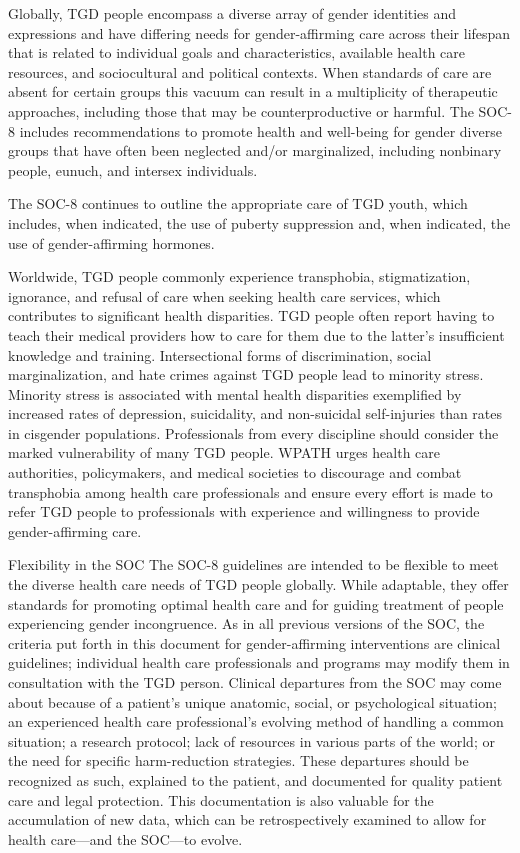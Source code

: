 \documentclass[
]{book}
\begin{document}
Globally, TGD people encompass a diverse
array of gender identities and expressions and
have differing needs for gender-affirming care
across their lifespan that is related to individual
goals and characteristics, available health care
resources, and sociocultural and political contexts.
When standards of care are absent for certain
groups this vacuum can result in a multiplicity
of therapeutic approaches, including those that
may be counterproductive or harmful. The SOC-8
includes recommendations to promote health and
well-being for gender diverse groups that have
often been neglected and/or marginalized, including nonbinary people, eunuch, and intersex
individuals.

The SOC-8 continues to outline the appropriate
care of TGD youth, which includes, when indicated, the use of puberty suppression and, when
indicated, the use of gender-affirming hormones.

Worldwide, TGD people commonly experience
transphobia, stigmatization, ignorance, and refusal
of care when seeking health care services, which
contributes to significant health disparities. TGD
people often report having to teach their medical
providers how to care for them due to the latter's
insufficient knowledge and training. Intersectional
forms of discrimination, social marginalization,
and hate crimes against TGD people lead to
minority stress. Minority stress is associated with
mental health disparities exemplified by increased
rates of depression, suicidality, and non-suicidal
self-injuries than rates in cisgender populations.
Professionals from every discipline should consider the marked vulnerability of many TGD
people. WPATH urges health care authorities,
policymakers, and medical societies to discourage
and combat transphobia among health care professionals and ensure every effort is made to
refer TGD people to professionals with experience
and willingness to provide
gender-affirming care.

Flexibility in the SOC
The SOC-8 guidelines are intended to be flexible
to meet the diverse health care needs of TGD
people globally. While adaptable, they offer standards for promoting optimal health care and for
guiding treatment of people experiencing gender
incongruence. As in all previous versions of the
SOC, the criteria put forth in this document for
gender-affirming interventions are clinical guidelines; individual health care professionals and
programs may modify them in consultation with
the TGD person. Clinical departures from the
SOC may come about because of a patient's
unique anatomic, social, or psychological situation; an experienced health care professional's
evolving method of handling a common situation;
a research protocol; lack of resources in various
parts of the world; or the need for specific
harm-reduction strategies. These departures
should be recognized as such, explained to the
patient, and documented for quality patient care
and legal protection. This documentation is also
valuable for the accumulation of new data, which
can be retrospectively examined to allow for
health care---and the SOC---to evolve.
\end{document}
